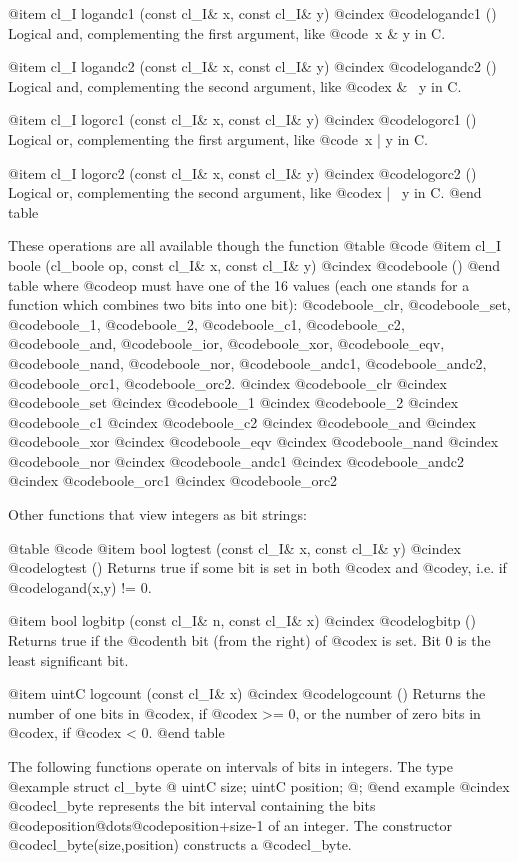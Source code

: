 @item cl_I logandc1 (const cl_I& x, const cl_I& y)
@cindex @code{logandc1 ()}
Logical and, complementing the first argument, like @code{~x & y} in C.

@item cl_I logandc2 (const cl_I& x, const cl_I& y)
@cindex @code{logandc2 ()}
Logical and, complementing the second argument, like @code{x & ~y} in C.

@item cl_I logorc1 (const cl_I& x, const cl_I& y)
@cindex @code{logorc1 ()}
Logical or, complementing the first argument, like @code{~x | y} in C.

@item cl_I logorc2 (const cl_I& x, const cl_I& y)
@cindex @code{logorc2 ()}
Logical or, complementing the second argument, like @code{x | ~y} in C.
@end table

These operations are all available though the function
@table @code
@item cl_I boole (cl_boole op, const cl_I& x, const cl_I& y)
@cindex @code{boole ()}
@end table
where @code{op} must have one of the 16 values (each one stands for a function
which combines two bits into one bit): @code{boole_clr}, @code{boole_set},
@code{boole_1}, @code{boole_2}, @code{boole_c1}, @code{boole_c2},
@code{boole_and}, @code{boole_ior}, @code{boole_xor}, @code{boole_eqv},
@code{boole_nand}, @code{boole_nor}, @code{boole_andc1}, @code{boole_andc2},
@code{boole_orc1}, @code{boole_orc2}.
@cindex @code{boole_clr}
@cindex @code{boole_set}
@cindex @code{boole_1}
@cindex @code{boole_2}
@cindex @code{boole_c1}
@cindex @code{boole_c2}
@cindex @code{boole_and}
@cindex @code{boole_xor}
@cindex @code{boole_eqv}
@cindex @code{boole_nand}
@cindex @code{boole_nor}
@cindex @code{boole_andc1}
@cindex @code{boole_andc2}
@cindex @code{boole_orc1}
@cindex @code{boole_orc2}


Other functions that view integers as bit strings:

@table @code
@item bool logtest (const cl_I& x, const cl_I& y)
@cindex @code{logtest ()}
Returns true if some bit is set in both @code{x} and @code{y}, i.e. if
@code{logand(x,y) != 0}.

@item bool logbitp (const cl_I& n, const cl_I& x)
@cindex @code{logbitp ()}
Returns true if the @code{n}th bit (from the right) of @code{x} is set.
Bit 0 is the least significant bit.

@item uintC logcount (const cl_I& x)
@cindex @code{logcount ()}
Returns the number of one bits in @code{x}, if @code{x} >= 0, or
the number of zero bits in @code{x}, if @code{x} < 0.
@end table

The following functions operate on intervals of bits in integers. 
The type
@example
struct cl_byte @{ uintC size; uintC position; @};
@end example
@cindex @code{cl_byte}
represents the bit interval containing the bits
@code{position}@dots{}@code{position+size-1} of an integer.
The constructor @code{cl_byte(size,position)} constructs a @code{cl_byte}.

